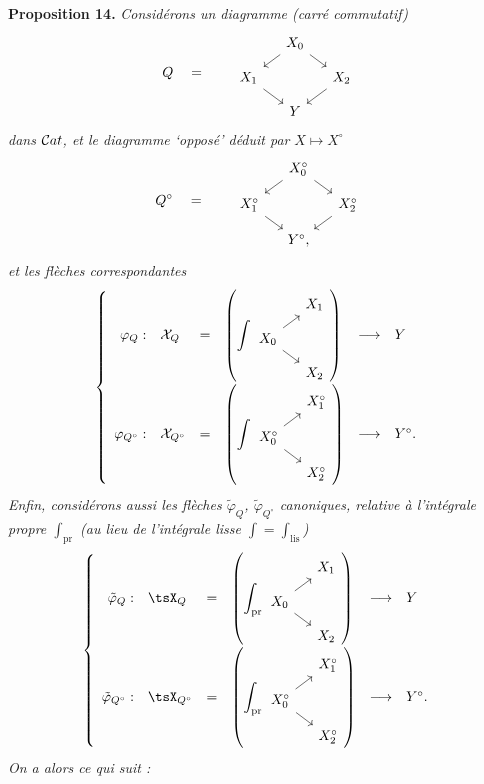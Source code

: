 \textbf{Proposition 14.} \textit{Considérons un diagramme (carré commutatif)}
\[
Q \quad = \qquad
\begin{tikzcd}[row sep=small, column sep=small]
 & X_0 \arrow[dl] \arrow[dr] & \\
X_1 \arrow[dr] & & X_2 \arrow[dl] \\
 & Y &
\end{tikzcd}
\]
\textit{dans} $\mathcal{C}at$\textit{, et le diagramme `opposé' déduit par} $X\longmapsto X^\circ$
\[
Q^\circ \quad = \qquad
\begin{tikzcd}[row sep=small, column sep=small]
 & X_0^\circ \arrow[dl] \arrow[dr] & \\
X_1^\circ \arrow[dr] & & X_2^\circ \arrow[dl] \\
 & Y^\circ, &
\end{tikzcd}
\]
\textit{et les flèches correspondantes}
\[
\left\{
\begin{array}{rlclcl}
\varphi_Q : & \sX_Q & = &
\left(\displaystyle\int
\begin{tikzcd}[ampersand replacement=\&, row sep=small, column sep=small]
 \& X_1 \\
X_0 \arrow[ur] \arrow[dr] \& \\
 \& X_2
\end{tikzcd}
\right)
& \longrightarrow & Y \\[2ex]
\varphi_{Q^\circ} : & \sX_{Q^\circ} & = &
\left(\displaystyle\int
\begin{tikzcd}[ampersand replacement=\&, row sep=small, column sep=small]
 \& X_1^\circ \\
X_0^\circ \arrow[ur] \arrow[dr] \& \\
 \& X_2^\circ
\end{tikzcd}
\right)
& \longrightarrow & Y^\circ.
\end{array}
\right.
\]
\textit{Enfin, considérons aussi les flèches $\tilde{\varphi}_Q$, $\tilde{\varphi}_{Q^\circ}$ canoniques, relative à l'intégrale propre $\int_{\mathrm{pr}}$} %
\textit{(au lieu de l'intégrale lisse $\int=\int_{\mathrm{lis}}$)}
\[
\left\{
\begin{array}{rlclcl}
\tilde{\varphi}_Q : & \tsX_Q & = &
\left(\displaystyle\int_{\mathrm{pr}}
\begin{tikzcd}[ampersand replacement=\&, row sep=small, column sep=small]
 \& X_1 \\
X_0 \arrow[ur] \arrow[dr] \& \\
 \& X_2
\end{tikzcd}
\right)
& \longrightarrow & Y \\[2ex]
\tilde{\varphi}_{Q^\circ} : & \tsX_{Q^\circ} & = &
\left(\displaystyle\int_{\mathrm{pr}}
\begin{tikzcd}[ampersand replacement=\&, row sep=small, column sep=small]
 \& X_1^\circ \\
X_0^\circ \arrow[ur] \arrow[dr] \& \\
 \& X_2^\circ
\end{tikzcd}
\right)
& \longrightarrow & Y^\circ.
\end{array}
\right.
\]
\textit{On a alors ce qui suit :}

